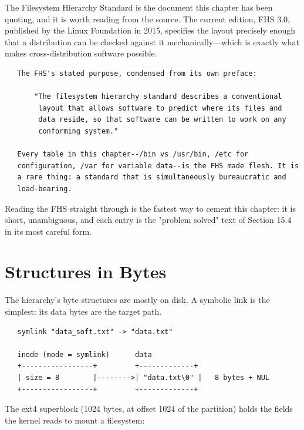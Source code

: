 \begin{researchnote}
The Filesystem Hierarchy Standard is the document this chapter has
been quoting, and it is worth reading from the source. The current
edition, FHS 3.0, published by the Linux Foundation in 2015, specifies
the layout precisely enough that a distribution can be checked against
it mechanically---which is exactly what makes cross-distribution
software possible.

\begin{verbatim}
   The FHS's stated purpose, condensed from its own preface:

       "The filesystem hierarchy standard describes a conventional
        layout that allows software to predict where its files and
        data reside, so that software can be written to work on any
        conforming system."

   Every table in this chapter--/bin vs /usr/bin, /etc for
   configuration, /var for variable data--is the FHS made flesh. It is
   a rare thing: a standard that is simultaneously bureaucratic and
   load-bearing.
\end{verbatim}

Reading the FHS straight through is the fastest way to cement this
chapter: it is short, unambiguous, and each entry is the "problem
solved" text of Section 15.4 in its most careful form.

\end{researchnote}

\section{Structures in Bytes}

The hierarchy's byte structures are mostly on disk. A symbolic link is
the simplest: its data bytes are the target path.

\begin{verbatim}
   symlink "data_soft.txt" -> "data.txt"

   inode (mode = symlink)      data
   +-----------------+         +-------------+
   | size = 8        |-------->| "data.txt\0" |   8 bytes + NUL
   +-----------------+         +-------------+
\end{verbatim}

The ext4 superblock (1024 bytes, at offset 1024 of the partition)
holds the fields the kernel reads to mount a filesystem:

